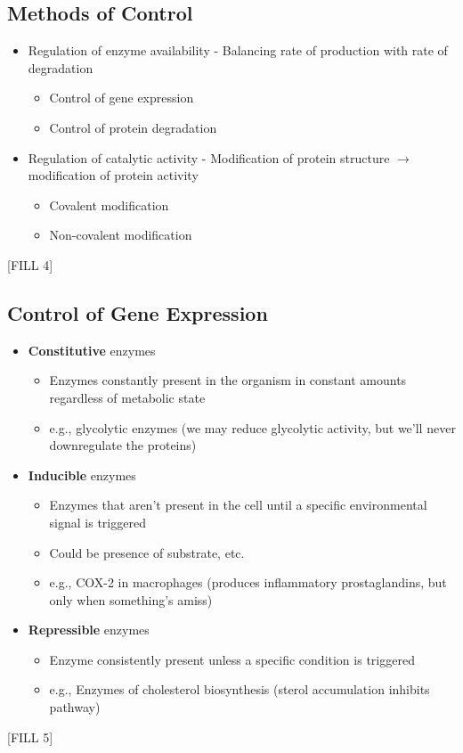 \documentclass[10pt]{article}
\begin{document}
\subsection*{Methods of Control}
\begin{itemize}
    \item Regulation of enzyme availability - Balancing rate of production with rate of degradation
    \begin{itemize}
        \item Control of gene expression
        \item Control of protein degradation
    \end{itemize}
    \item Regulation of catalytic activity - Modification of protein structure $\rightarrow$ modification of protein activity
    \begin{itemize}
        \item Covalent modification
        \item Non-covalent modification
    \end{itemize}
\end{itemize}
\begin{center}
    [FILL 4]
\end{center}

\subsection*{Control of Gene Expression}
\begin{itemize}
    \item \textbf{Constitutive} enzymes
    \begin{itemize}
        \item Enzymes constantly present in the organism in constant amounts regardless of metabolic state
        \item e.g., glycolytic enzymes (we may reduce glycolytic activity, but we'll never downregulate the proteins)
    \end{itemize}
    \item \textbf{Inducible} enzymes
    \begin{itemize}
        \item Enzymes that aren't present in the cell until a specific environmental signal is triggered
        \item Could be presence of substrate, etc.
        \item e.g., COX-2 in macrophages (produces inflammatory prostaglandins, but only when something's amiss)
    \end{itemize}
    \item \textbf{Repressible} enzymes
    \begin{itemize}
        \item Enzyme consistently present unless a specific condition is triggered
        \item e.g., Enzymes of cholesterol biosynthesis (sterol accumulation inhibits pathway)
    \end{itemize}
\end{itemize}
\begin{center}
    [FILL 5]
\end{center}
\end{document}
